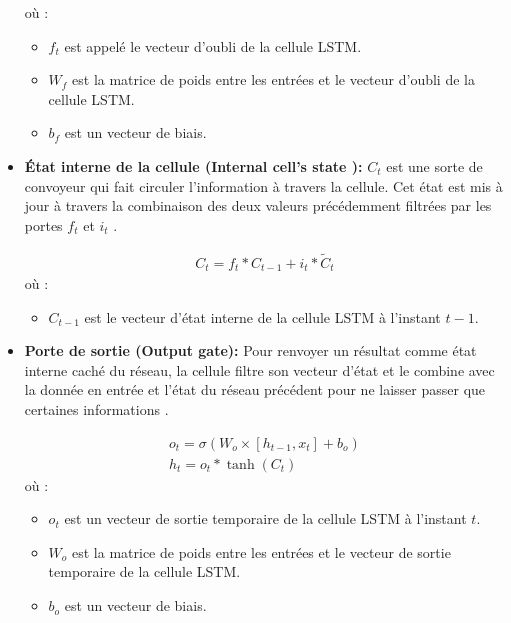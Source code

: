 \begin{itemize}
		où : 
	\begin{itemize}
		\item $f_t$ est appelé le vecteur d'oubli de la cellule LSTM.
		\item $W_f$ est la matrice de poids entre les entrées et le vecteur d'oubli de la cellule LSTM.
		\item $b_f$ est un vecteur de biais.		
	\end{itemize}
	\item \textbf{État interne de la cellule (Internal cell's state ): } $C_t$ est une sorte de convoyeur qui fait circuler l'information à travers la cellule. Cet état est mis à jour à travers la combinaison des deux valeurs précédemment filtrées par les portes $f_t$ et $i_t$ \citep{lstm_original_paper}.
	
	\begin{equation}
	\begin{gathered}
	C_t = f_t * C_{t-1} + i_t*\tilde{C}_t
	\end{gathered}
	\end{equation}
	où :
	\begin{itemize}
		\item $C_{t-1}$ est le vecteur d'état interne de la cellule LSTM à l'instant $t-1$.
	\end{itemize}
	\item \textbf{Porte de sortie (Output gate): } Pour renvoyer un résultat comme état interne caché du réseau, la cellule filtre son vecteur d'état et le combine avec la donnée en entrée et l'état du réseau précédent pour ne laisser passer que certaines informations \citep{rnns_online,lstm_original_paper,rnn_lstms}.
	
	\begin{equation}
	\begin{gathered}
	o_t =  \sigma(W_o \times [h_{t-1},x_t] + b_o) \\
	h_t = o_t * \tanh(C_t)
	\end{gathered}
	\end{equation}
	où :
	\begin{itemize}
		\item $o_{t}$ est un vecteur de sortie temporaire de la cellule LSTM à l'instant $t$.
		\item $W_o$ est la matrice de poids entre les entrées et le vecteur de sortie temporaire de la cellule LSTM.
		\item $b_o$ est un vecteur de biais.
			
	\end{itemize}
\end{itemize}

